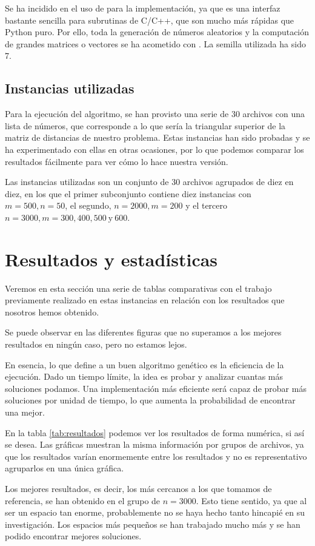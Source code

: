 Se ha incidido en el uso de  para la implementación, ya que es una interfaz bastante sencilla para subrutinas de C/C++, que son mucho más rápidas que Python puro. Por ello, toda la generación de números aleatorios y la computación de grandes matrices o vectores se ha acometido con . La semilla utilizada ha sido 7.

\subsection{Instancias utilizadas}
Para la ejecución del algoritmo, se han provisto una serie de 30 archivos con una lista de números, que corresponde a lo que sería la triangular superior de la matriz de distancias de nuestro problema. Estas instancias han sido probadas y se ha experimentado con ellas en otras ocasiones, por lo que podemos comparar los resultados fácilmente para ver cómo lo hace nuestra versión.

Las instancias utilizadas son un conjunto de 30 archivos agrupados de diez en diez, en los que el primer subconjunto contiene diez instancias con $m = 500, n=50$, el segundo, $n = 2000, m = 200$ y el tercero $n = 3000, m = 300, 400, 500 \ \text{y} \ 600$.

\section{Resultados y estadísticas}
Veremos en esta sección una serie de tablas comparativas con el trabajo previamente realizado en estas instancias en relación con los resultados que nosotros hemos obtenido.

Se puede observar en las diferentes figuras que no superamos a los mejores resultados en ningún caso, pero no estamos lejos.

En esencia, lo que define a un buen algoritmo genético es la eficiencia de la ejecución. Dado un tiempo límite, la idea es probar y analizar cuantas más soluciones podamos. Una implementación más eficiente será capaz de probar más soluciones por unidad de tiempo, lo que aumenta la probabilidad de encontrar una mejor.

En la tabla \ref{tab:resultados} podemos ver los resultados de forma numérica, si así se desea. Las gráficas muestran la misma información por grupos de archivos, ya que los resultados varían enormemente entre los resultados y no es representativo agruparlos en una única gráfica.

Los mejores resultados, es decir, los más cercanos a los que tomamos de referencia, se han obtenido en el grupo de $n = 3000$. Esto tiene sentido, ya que al ser un espacio tan enorme, probablemente no se haya hecho tanto hincapié en su investigación. Los espacios más pequeños se han trabajado mucho más y se han podido encontrar mejores soluciones.

